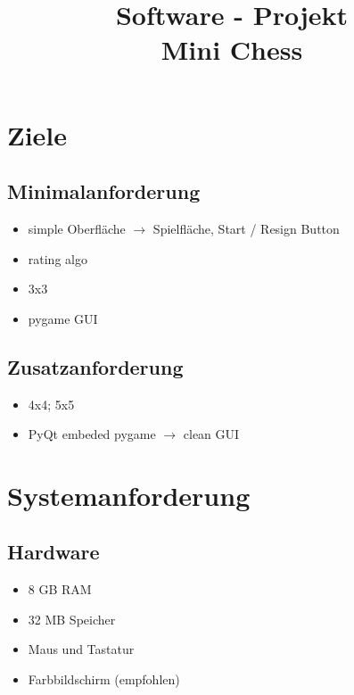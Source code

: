 \documentclass{article}
\title{\textbf{Software - Projekt\\Mini Chess}}
\date{\vspace{-5ex}}
\begin{document}
\maketitle
\thispagestyle{fancy}


\tableofcontents
\newpage


\section{Ziele}\label{section-goals}

\subsection{Minimalanforderung}
\begin{itemize}
    \item simple Oberfläche $\rightarrow$ Spielfläche, Start / Resign Button
    \item rating algo
    \item 3x3
    \item pygame GUI
\end{itemize}

\subsection{Zusatzanforderung}
\begin{itemize}
    \item 4x4; 5x5
    \item PyQt embeded pygame $\rightarrow$ clean GUI
\end{itemize}


\newpage
\section{Systemanforderung}\label{section-requirements}

\subsection{Hardware}
\begin{itemize}
    \item 8 GB RAM
    \item 32 MB Speicher
    \item Maus und Tastatur
    \item Farbbildschirm (empfohlen)
\end{itemize}
\end{document}
